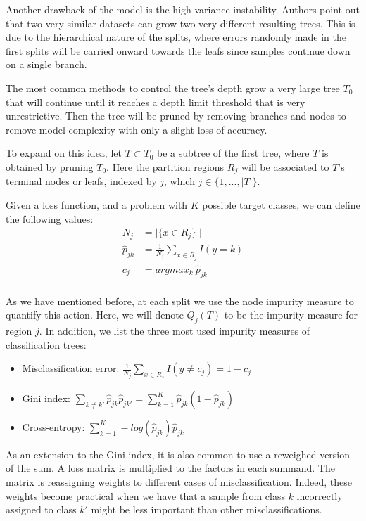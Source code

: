 Another drawback of the model is the high variance instability. Authors point out that two very similar datasets can grow two very different resulting trees. This is due to the hierarchical nature of the splits, where errors randomly made in the first splits will be carried onward towards the leafs since samples continue down on a single branch.

The most common methods to control the tree's depth grow a very large tree $T_0$ that will continue until it reaches a depth limit threshold that is very unrestrictive. Then the tree will be pruned by removing branches and nodes to remove model complexity with only a slight loss of accuracy.

To expand on this idea, let $T \subset T_0$ be a subtree of the first tree, where $T$ is obtained by pruning $T_0$. Here the partition regions $R_j$ will be associated to $T$'s terminal nodes or leafs, indexed by $j$, which $j \in \{1,...,|T| \}$.

Given a loss function, and a problem with $K$ possible target classes, we can define the following values:
\begin{equation}
\begin{split}
N_j & = \mid\{x \in R_j \}\mid\\
\hat{p}_{jk} & = \frac{1}{N_j} \sum_{x \in R_j} I(y=k)\\
c_j & = argmax_{k} \ \hat{p}_{jk} \\
\end{split}
\end{equation}\label{decisionTreePruneParameters}

As we have mentioned before, at each split we use the node impurity measure to quantify this action. Here, we will denote $Q_j(T)$ to be the impurity measure for region $j$. In addition, we list the three most used impurity measures of classification trees:

\begin{itemize}
\item Misclassification error: $ \displaystyle \frac{1}{N_j} \sum_{x \in R_j} I(y\neq c_j) = 1 - c_j $
\item Gini index: $ \displaystyle \sum_{k\neq k'} \hat{p}_{jk} \hat{p}_{jk'}  = \sum_{k=1}^{K} \hat{p}_{jk} (1 - \hat{p}_{jk}) $
\item Cross-entropy: $ \displaystyle \sum_{k=1}^{K} -log(\hat{p}_{jk})\hat{p}_{jk} $
\end{itemize}


As an extension to the Gini index, it is also common to use a reweighed version of the sum. A loss matrix is multiplied to the factors in each summand. The matrix is reassigning weights to different cases of misclassification. Indeed, these weights become practical when we have that a sample from class $k$ incorrectly assigned to class $k'$ might be less important than other misclassifications.


